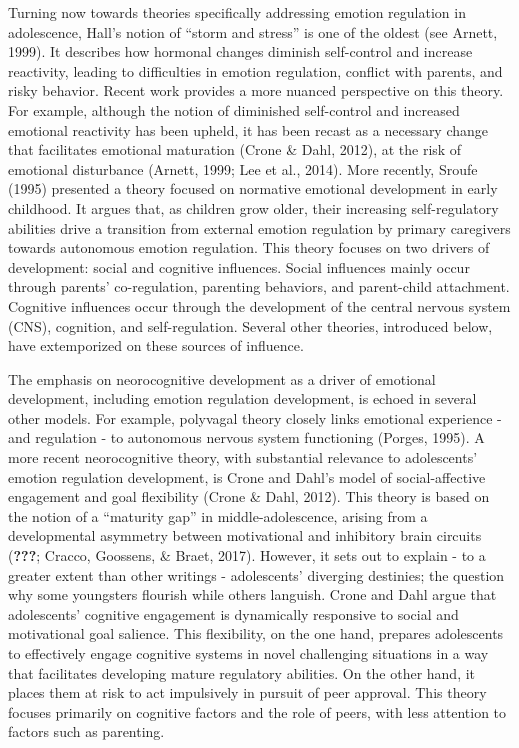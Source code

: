 \documentclass[
  english,
  man]{apa6}
\begin{document}
Turning now towards theories specifically addressing emotion regulation in
adolescence, Hall's notion of \enquote{storm and stress} is one of the oldest (see Arnett, 1999). It describes how hormonal changes diminish
self-control and increase reactivity, leading to difficulties in emotion
regulation, conflict with parents, and risky behavior. Recent work provides a
more nuanced perspective on this theory. For example, although the notion of
diminished self-control and increased emotional reactivity has been upheld, it
has been recast as a necessary change that facilitates emotional maturation
(Crone \& Dahl, 2012), at the risk of emotional
disturbance (Arnett, 1999; Lee et al., 2014).
More recently, Sroufe (1995) presented
a theory focused on normative emotional development in early childhood. It
argues that, as children grow older, their increasing self-regulatory abilities
drive a transition from external emotion regulation by primary caregivers
towards autonomous emotion regulation. This theory focuses on two drivers of
development: social and cognitive influences. Social influences mainly occur
through parents' co-regulation, parenting behaviors, and parent-child
attachment. Cognitive influences occur through the development of the central
nervous system (CNS), cognition, and self-regulation. Several other theories,
introduced below, have extemporized on these sources of influence.

The emphasis on neorocognitive development as a driver of emotional
development, including emotion regulation development, is echoed in several
other models. For example, polyvagal theory closely links emotional experience
- and regulation - to autonomous nervous system functioning
(Porges, 1995). A more recent neorocognitive theory, with
substantial relevance to adolescents' emotion regulation development, is Crone
and Dahl's model of social-affective engagement and goal flexibility
(Crone \& Dahl, 2012). This theory is based on the notion
of a \enquote{maturity gap} in middle-adolescence, arising from a developmental
asymmetry between motivational and inhibitory brain circuits
({\textbf{???}}; Cracco, Goossens, \& Braet, 2017). However, it sets out to explain - to
a greater extent than other writings - adolescents' diverging destinies; the
question why some youngsters flourish while others languish. Crone and Dahl
argue that adolescents' cognitive engagement is dynamically responsive to
social and motivational goal salience. This flexibility, on the one hand,
prepares adolescents to effectively engage cognitive systems in novel
challenging situations in a way that facilitates developing mature regulatory
abilities. On the other hand, it places them at risk to act impulsively in
pursuit of peer approval. This theory focuses primarily on cognitive factors
and the role of peers, with less attention to factors such as parenting.
\end{document}
